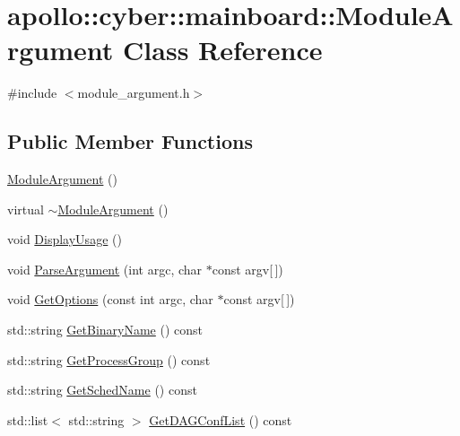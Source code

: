\hypertarget{classapollo_1_1cyber_1_1mainboard_1_1ModuleArgument}{\section{apollo\-:\-:cyber\-:\-:mainboard\-:\-:Module\-Argument Class Reference}
\label{classapollo_1_1cyber_1_1mainboard_1_1ModuleArgument}
}


{\ttfamily \#include $<$module\-\_\-argument.\-h$>$}

\subsection*{Public Member Functions}
\begin{DoxyCompactItemize}
\item 
\hyperlink{classapollo_1_1cyber_1_1mainboard_1_1ModuleArgument_a7166085b9312729d7239fee89f78318a}{Module\-Argument} ()
\item 
virtual \hyperlink{classapollo_1_1cyber_1_1mainboard_1_1ModuleArgument_ab6b48cf32ae57d0e5b4d983ca81f46d3}{$\sim$\-Module\-Argument} ()
\item 
void \hyperlink{classapollo_1_1cyber_1_1mainboard_1_1ModuleArgument_a379cf2026e2e7b14c36eade3edc0756d}{Display\-Usage} ()
\item 
void \hyperlink{classapollo_1_1cyber_1_1mainboard_1_1ModuleArgument_a9ceac6702b644d5a1456abefc297246f}{Parse\-Argument} (int argc, char $\ast$const argv\mbox{[}$\,$\mbox{]})
\item 
void \hyperlink{classapollo_1_1cyber_1_1mainboard_1_1ModuleArgument_a3dcb5d3f0fb59df1ba95db07eb404f12}{Get\-Options} (const int argc, char $\ast$const argv\mbox{[}$\,$\mbox{]})
\item 
std\-::string \hyperlink{classapollo_1_1cyber_1_1mainboard_1_1ModuleArgument_ad11123c463a6954c676e73096eb8767a}{Get\-Binary\-Name} () const 
\item 
std\-::string \hyperlink{classapollo_1_1cyber_1_1mainboard_1_1ModuleArgument_a9500250c4954ffb4c576c8cfcf0474f3}{Get\-Process\-Group} () const 
\item 
std\-::string \hyperlink{classapollo_1_1cyber_1_1mainboard_1_1ModuleArgument_a15096c4d30938849a84189b1531fda06}{Get\-Sched\-Name} () const 
\item 
std\-::list$<$ std\-::string $>$ \hyperlink{classapollo_1_1cyber_1_1mainboard_1_1ModuleArgument_a4efe388c9f930f20331028222ce79c40}{Get\-D\-A\-G\-Conf\-List} () const 
\end{DoxyCompactItemize}
